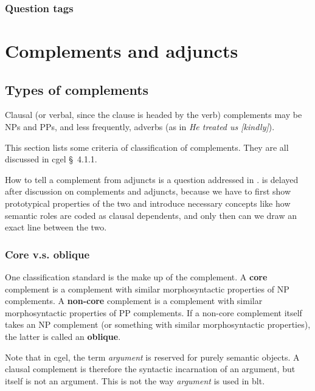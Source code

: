 \documentclass{article}
\newcommand*{\citesec}[1]{\S~{#1}}
\newcommand*{\concept}[1]{\textbf{#1}}
\newcommand*{\term}[1]{\emph{#1}}
\newcommand*{\corpus}[1]{\emph{#1}}
\begin{document}
\subsubsection{Question tags}\label{sec:question-tag}

\section{Complements and adjuncts}\label{sec:nucleus-dependents}

\subsection{Types of complements}\label{sec:types-of-complements}

Clausal (or verbal, since the clause is headed by the verb) complements 
may be NPs and PPs, and less frequently, adverbs 
(as in \corpus{He treated us [kindly]}). %

This section lists some criteria of classification of complements.
They are all discussed in \ac{cgel} \citesec{4.1.1}.


How to tell a complement from adjuncts is a question addressed in .
 is delayed after discussion on complements and adjuncts,
because we have to first show prototypical properties of the two 
and introduce necessary concepts like how semantic roles are coded as clausal dependents,
and only then can we draw an exact line between the two.

\subsubsection{Core v.s. oblique}\label{sec:core-oblique}

One classification standard is the make up of the complement.
A \concept{core} complement is a complement with similar morphosyntactic properties of NP complements.
A \concept{non-core} complement is a complement with similar morphosyntactic properties of PP complements.
If a non-core complement itself takes an NP complement (or something with similar morphosyntactic properties),
the latter is called an \concept{oblique}.

Note that in \ac{cgel}, the term \term{argument} is reserved for purely semantic objects.
A clausal complement is therefore the syntactic incarnation of an argument,
but itself is not an argument.
This is not the way \term{argument} is used in \ac{blt}.
\end{document}
